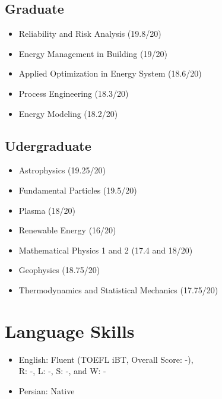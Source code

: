 \documentclass[letter,20pt]{article}
\begin{document}
\subsection*{Graduate}
\begin{itemize}[leftmargin=6ex]
    \item  Reliability and Risk Analysis (19.8/20) 
    \item  Energy Management in Building (19/20)
    \item  Applied Optimization in Energy System (18.6/20)
    \item  Process Engineering (18.3/20) 
    \item  Energy Modeling (18.2/20) 
\end{itemize}

\subsection*{Udergraduate}
\begin{itemize}[leftmargin=6ex]
    \item  Astrophysics (19.25/20)
    \item  Fundamental Particles (19.5/20)
    \item  Plasma (18/20)
    \item  Renewable Energy (16/20)
    \item  Mathematical Physics 1 and 2 (17.4 and 18/20)
    \item  Geophysics (18.75/20)
    \item  Thermodynamics and Statistical Mechanics (17.75/20)
\end{itemize}

\section{Language Skills}	    
\vspace{5pt}

\begin{itemize}[leftmargin=3ex]
	\item   {{English:}} Fluent (TOEFL iBT, Overall Score: -),\\ 
	\hspace*{10pt}	R: -, L: -, S: -, and W: -\\
    \item  Persian: Native   
\end{itemize}
\end{document}
